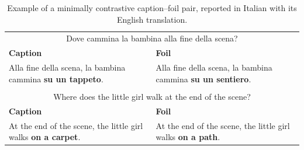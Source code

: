 \begin{table}[h]
    \centering
    \small
    \renewcommand{\arraystretch}{1.35}

    \begin{tabularx}{\linewidth}{|X|X|}
        \hline


        \rowcolor{EcoForestGreen!55}
        \multicolumn{2}{|c|}{
            \textcolor{white}{\textbf{Domanda}}
        } \\
        \hline

        \multicolumn{2}{|c|}{
            \parbox{0.94\linewidth}{
                \centering
                Dove cammina la bambina alla fine della scena?
            }
        } \\
        \hline

        \textbf{\textcolor{EcoForestGreen}{Caption}} &
        \textbf{\textcolor{EcoForestGreen}{Foil}} \\
        \hline

        Alla fine della scena, la bambina cammina
        \textbf{su un tappeto}. &
        Alla fine della scena, la bambina cammina
        \textbf{su un sentiero}. \\
        \hline

        \rowcolor{EcoForestGreen!55}
        \multicolumn{2}{|c|}{
            \textcolor{white}{\textbf{Question}}
        } \\
        \hline

        \multicolumn{2}{|c|}{
            \parbox{0.94\linewidth}{
                \centering
                Where does the little girl walk at the end of the scene?
            }
        } \\
        \hline

        \textbf{\textcolor{EcoForestGreen}{Caption}} &
        \textbf{\textcolor{EcoForestGreen}{Foil}} \\
        \hline

        At the end of the scene, the little girl walks
        \textbf{on a carpet}. &
        At the end of the scene, the little girl walks
        \textbf{on a path}. \\
        \hline

    \end{tabularx}

    \caption{Example of a minimally contrastive caption--foil pair, reported in Italian with its English translation.}
    \label{tab:minimal-contrastive-pair}
\end{table}
